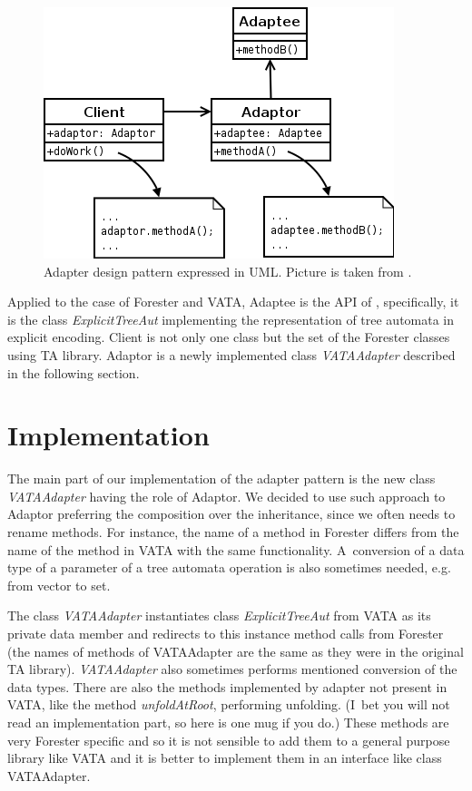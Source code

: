\begin{figure}
	\begin{center}
		\includegraphics[scale=0.4]{fig/adapter.png}
	\end{center}
	\caption{Adapter design pattern expressed in UML.
	Picture is taken from \cite{wiki:adapter}.}
	\label{fig:adapter}
\end{figure}

Applied to the case of Forester and VATA,
Adaptee is the API of \vata, specifically, it is the class \emph{ExplicitTreeAut}
implementing the representation of tree automata in explicit encoding.
Client is not only one class but the set of the Forester classes using TA library.
Adaptor is a newly implemented class \emph{VATAAdapter} described in the following section.

\section{Implementation}
\label{sec:fova_impl}

The main part of our implementation of the adapter pattern is
the new class \emph{VATAAdapter} having the role of Adaptor.
We decided to use such approach to Adaptor preferring the composition over the inheritance,
since we often needs to rename methods.
For instance, the name of a method in Forester differs from
the name of the method in VATA with the same functionality.
A~conversion of a data type of a parameter of a tree automata operation
is also sometimes needed, e.g. from vector to set. 

The class \emph{VATAAdapter} instantiates class \emph{ExplicitTreeAut} from VATA as its private data member
and redirects to this instance method calls from Forester (the names of methods of VATAAdapter are the same as they were
in the original TA library).
\emph{VATAAdapter} also sometimes performs mentioned conversion of the data types.
There are also the methods implemented by adapter not present
in VATA, like the method \emph{unfoldAtRoot}, performing unfolding.
(I~bet you will not read an implementation part, so here is one mug if you do.) %
These methods are very Forester specific
and so it is not sensible to add them to a general purpose library like VATA
and it is better to implement them in an interface like class VATAAdapter.


